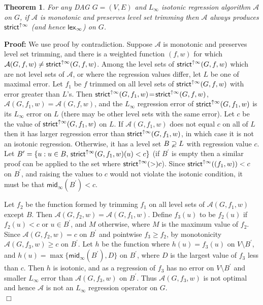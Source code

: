 \documentclass[11pt]{article}
\newtheorem{theorem}{Theorem}
\newcommand{\setmean}[1]{\ensuremath{\mathsf{mid}_\infty(#1)}}
\newcommand{\Strictup}[2]{\ensuremath{\mathsf{strict}^{\uparrow {#1}}\ifthenelse{\equal{#2}{}}{}{(#2)}}}
\newcommand{\lex}[2]{\ensuremath{\mathsf{lex}_{#1} \ifthenelse{\equal{#2}{}}{}{(#2)}}}
\begin{document}
\begin{theorem}
For any DAG $G = (V,E)$ and $L_\infty$ isotonic regression algorithm $\mathcal{A}$ on $G$, if $\mathcal{A}$ is monotonic and
preserves level set trimming then $\mathcal{A}$ always produces \Strictup{\infty}{} (and hence \lex{\infty}{}) on $G$.
\end{theorem}
\textbf{Proof:}
We use proof by contradiction.
Suppose $\mathcal{A}$ is monotonic and preserves level set trimming, and there
is a weighted function $(f,w)$ for which $\mathcal{A}(G,f,w) \neq \Strictup{\infty}{G,f,w}$.
Among the level sets of \Strictup{\infty}{G,f,w} which are not level sets of $\mathcal{A}$, or where the
regression values differ, let $L$ be one of maximal error.
Let $f_1$ be $f$ trimmed on all level sets of \Strictup{\infty}{G,f,w}
with error greater than $L$'s.
Then $\Strictup{\infty}{G,f_1,w} \!=\! \Strictup{\infty}{G,f,w}$,\, $\mathcal{A}(G,f_1,w)\!=\!\mathcal{A}(G,f,w)$,
and the $L_\infty$ regression error of $\Strictup{\infty}{G,f_1,w}$ is its $L_\infty$ error on $L$ (there may be other
level sets with the same error).
Let $c$ be the value of \Strictup{\infty}{G,f_1,w} on $L$.
If $\mathcal{A}(G,f_1,w)$ does not equal $c$ on all of $L$ then it has larger regression error
than $\Strictup{\infty}{G,f_1,w}$, in
which case it is not an isotonic regression.
Otherwise, it has a level set
$B \varsupsetneq L$ with regression value $c$.
Let $B^\prime = \{u: u \in B,\,
  \Strictup{\infty}{G,f_1,w}(u) < c\}$
(if $B^\prime$ is empty then a similar proof can be applied to the set where
$\Strictup{\infty} > c$).
Since $\Strictup{\infty}{(f_1,w)} < c$ on $B^\prime$, and raising the values to $c$ would not violate
the isotonic condition, it must be that $\setmean{B^\prime} < c$.

Let $f_2$ be the function formed by trimming $f_1$ on all level sets of $\mathcal{A}(G,f_1,w)$ except $B$.  
Then $\mathcal{A}(G,f_2,w) = \mathcal{A}(G,f_1,w)$.
Define $f_3(u)$ to be $f_2(u)$ if $f_2(u) < c$ or 
$u \in B^\prime$,
and $M$ otherwise, where $M$ is the maximum value of $f_2$.
Since $\mathcal{A}(G,f_2,w) = c$ on $B^\prime$ and pointwise $f_3 \geq f_2$, 
by monotonicity 
$\mathcal{A}(G,f_3,w) \geq c$ on $B^\prime$.
Let $h$ be the function where $h(u) = f_3(u)$ on $V \setminus B^\prime$, and
$h(u) = \max\{\setmean{B^\prime},D\}$ on $B^\prime$, where $D$ is the largest value of
$f_3$ less than $c$.
Then $h$ is isotonic, and as a regression of $f_3$
has no error on $V \setminus B^\prime$
and smaller $L_\infty$ error than $\mathcal{A}(G,f_3,w)$ on $B^\prime$.
Thus $\mathcal{A}(G,f_3,w)$ is not optimal and hence $\mathcal{A}$ is not an $L_\infty$
regression operator on $G$.\\
$\Box$
\end{document}

